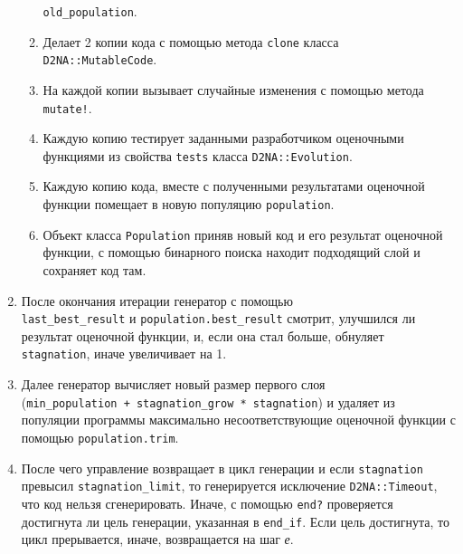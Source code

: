 \documentclass[utf8,a5paper,portrait,10pt,twoside]{eskdtext}
\begin{document}
\begin{enumerate}
\begin{enumerate}
                \texttt{old\_population}.
          \item Делает 2 копии кода с помощью метода \texttt{clone} класса
                \texttt{D2NA::MutableCode}.
          \item На каждой копии вызывает случайные изменения с помощью метода
                \texttt{mutate!}.
          \item Каждую копию тестирует заданными разработчиком оценочными
                функциями из свойства \texttt{tests} класса
                \texttt{D2NA::Evolution}.
          \item Каждую копию кода, вместе с полученными результатами оценочной
                функции помещает в новую популяцию \texttt{population}.
          \item Объект класса \texttt{Population} приняв новый код и его
                результат оценочной функции, с помощью бинарного поиска находит
                подходящий слой и сохраняет код там.
        \end{enumerate}
  \item После окончания итерации генератор с помощью\\
        \texttt{last\_best\_result} и \texttt{population.best\_result} смотрит,
        улучшился ли результат оценочной функции, и, если она стал больше,
        обнуляет \texttt{stagnation}, иначе увеличивает на 1.
  \item Далее генератор вычисляет новый размер первого слоя\\
        (\texttt{min\_population + stagnation\_grow * stagnation}) и удаляет из
        популяции программы максимально несоответствующие оценочной функции с
        помощью \texttt{population.trim}.
  \item После чего управление возвращает в цикл генерации и если
        \texttt{stagnation} превысил \texttt{stagnation\_limit}, то генерируется
        исключение \texttt{D2NA::Timeout}, что код нельзя сгенерировать.
        Иначе, с помощью \texttt{end?} проверяется достигнута ли цель генерации,
        указанная в \texttt{end\_if}. Если цель достигнута, то цикл прерывается,
        иначе, возвращается на шаг \textit{е}.
\end{enumerate}
\end{document}
